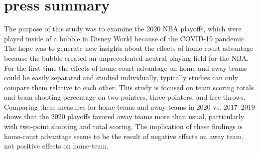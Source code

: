 \documentclass[10pt]{article}
\begin{document}
\section*{press summary}
The purpose of this study was to examine the 2020 NBA playoffs, which
were played inside of a bubble in Disney World because of the COVID-19
pandemic. The hope was to generate new insights about the effects of
home-court advantage because the bubble created an unprecedented
neutral playing field for the NBA. For the first time the effects of
home-court advantage on home and away teams could be easily separated
and studied individually, typically studies can only compare them
relative to each other. This study is focused on team scoring totals
and team shooting percentage on two-pointers, three-pointers, and free
throws. Comparing these measures for home teams and away teams in 2020
vs. 2017--2019 shows that the 2020 playoffs favored away teams more
than usual, particularly with two-point shooting and total
scoring. The implication of these findings is home-court advantage
seems to be the result of negative effects on away team, not positive
effects on home-team.
\end{document}
